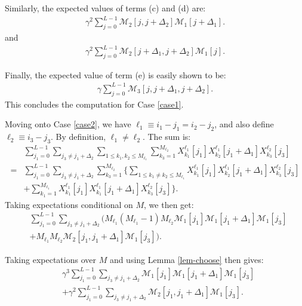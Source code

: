 \documentclass{article}
\theoremstyle{thm}
\theoremstyle{definition}
\newcommand{\1}{\mathbf{1}}
\newcommand{\M}{\mathcal{M}}
\begin{document}
Similarly, the expected values of terms (c) and (d) are:
%
\begin{align} \label{cccc}
%
\gamma^2 \sum_{j=0}^{L-1} \M_2[j,j+\Delta_2] \M_1[j+\Delta_1].
%
\end{align}
%
and
%
\begin{align} \label{dddd}
%
\gamma^2 \sum_{j=0}^{L-1} \M_2[j+\Delta_1,j+\Delta_2] \M_1[j].
%
\end{align}

Finally, the expected value of term (e) is easily shown to be:
%
\begin{align} \label{eeee}
%
\gamma \sum_{j=0}^{L-1} \M_3[j,j+\Delta_1,j+\Delta_2].
%
\end{align}
%
This concludes the computation for Case \ref{case1}.

Moving onto Case \ref{case2}, we have $\ell_1 \equiv i_1 - j_1 = i_2 - j_2$, and also define $\ell_2 \equiv i_3 - j_3$. By definition, $\ell_1 \ne \ell_2$. The sum is:
%
\begin{align}
%
& \sum_{j_1=0}^{L-1} \sum_{j_3 \ne j_1 + \Delta_2}
    \sum_{1 \le k_1,k_2 \le M_{\ell_1}} \sum_{k_3=1}^{M_{\ell_2}}
        X_{k_1}^{\ell_1}[j_1] X_{k_2}^{\ell_1}[j_1 + \Delta_1] X_{k_3}^{\ell_2}[j_3]   
    \nonumber \\
=& \sum_{j_1=0}^{L-1} \sum_{j_3 \ne j_1 + \Delta_2} \sum_{k_3=1}^{M_{\ell_2}}
    \Bigg\{
    \sum_{1 \le k_1 \ne k_2 \le M_{\ell_1}} 
        X_{k_1}^{\ell_1}[j_1] X_{k_2}^{\ell_1}[j_1 + \Delta_1] X_{k_3}^{\ell_2}[j_3]
    \nonumber \\
&       + \sum_{k_1=1}^{M_{\ell_1}} X_{k_1}^{\ell_1}[j_1] X_{k_1}^{\ell_1}[j_1 + \Delta_1] 
            X_{k_3}^{\ell_2}[j_3]  \Bigg\}.
%
\end{align}
%
Taking expectations conditional on $M$, we then get:
%
\begin{align}
%
& \sum_{j_1=0}^{L-1} \sum_{j_3 \ne j_1 + \Delta_2} 
    \Bigg(M_{\ell_1} (M_{\ell_1}-1) M_{\ell_2} \M_1[j_1] \M_1[j_1 + \Delta_1] \M_1[j_3]
    \nonumber \\
&       + M_{\ell_1} M_{\ell_2} \M_2[j_1,j_1+\Delta_1] \M_1[j_3] \Bigg).
%
\end{align}

Taking expectations over $M$ and using Lemma \ref{lem-choose} then gives:
%
\begin{align}
%
& \gamma^3 \sum_{j_1=0}^{L-1} \sum_{j_3 \ne j_1 + \Delta_2} 
        \M_1[j_1] \M_1[j_1 + \Delta_1] \M_1[j_3]
    \label{ffff} \\
& + \gamma^2 \sum_{j_1=0}^{L-1} \sum_{j_3 \ne j_1 + \Delta_2}  
        \M_2[j_1,j_1+\Delta_1] \M_1[j_3].
    \label{gggg}
%
\end{align}
\end{document}
